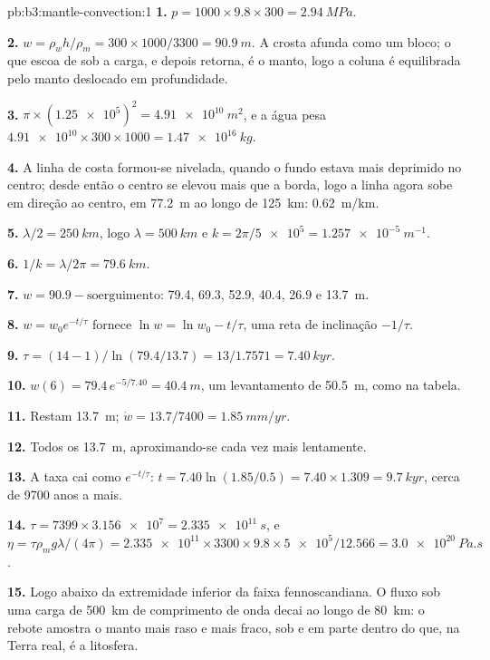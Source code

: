 \begin{solution}{pb:b3:mantle-convection:1}
\textbf{1.} $p = 1000\times9.8\times300 = \qty{2.94}{MPa}$.

\textbf{2.} $w = \rho_wh/\rho_m = 300\times1000/3300 = \qty{90.9}{m}$. A crosta
afunda como um bloco; o que escoa de sob a carga, e depois retorna, é o
manto, logo a coluna é equilibrada pelo manto deslocado em profundidade.

\textbf{3.} $\pi\times(\num{1.25e5})^2 = \qty{4.91e10}{m^2}$, e a água
pesa $\num{4.91e10}\times300\times1000 = \qty{1.47e16}{kg}$.

\textbf{4.} A linha de costa formou-se nivelada, quando o fundo estava mais deprimido no
centro; desde então o centro se elevou mais que a borda, logo a linha agora
sobe em direção ao centro, em \qty{77.2}{m} ao longo de \qty{125}{km}:
\qty{0.62}{m/km}.

\textbf{5.} $\lambda/2 = \qty{250}{km}$, logo $\lambda = \qty{500}{km}$ e $k =
2\pi/\num{5e5} = \qty{1.257e-5}{m^{-1}}$.

\textbf{6.} $1/k = \lambda/2\pi = \qty{79.6}{km}$.

\textbf{7.} $w = 90.9 - \text{soerguimento}$: 79.4, 69.3, 52.9, 40.4, 26.9 e
\qty{13.7}{m}.

\textbf{8.} $w = w_0e^{-t/\tau}$ fornece $\ln w = \ln w_0 - t/\tau$, uma reta
de inclinação $-1/\tau$.

\textbf{9.} $\tau = (14 - 1)/\ln(79.4/13.7) = 13/1.7571 = \qty{7.40}{kyr}$.

\textbf{10.} $w(6) = 79.4\,e^{-5/7.40} = \qty{40.4}{m}$, um levantamento de
\qty{50.5}{m}, como na tabela.

\textbf{11.} Restam \qty{13.7}{m}; $\dot w = 13.7/7400 = \qty{1.85}{mm/yr}$.

\textbf{12.} Todos os \qty{13.7}{m}, aproximando-se cada vez mais lentamente.

\textbf{13.} A taxa cai como $e^{-t/\tau}$: $t = 7.40\ln(1.85/0.5) =
7.40\times1.309 = \qty{9.7}{kyr}$, cerca de 9700 anos a mais.

\textbf{14.} $\tau = 7399\times\num{3.156e7} = \qty{2.335e11}{s}$, e $\eta =
\tau\rho_mg\lambda/(4\pi) = \num{2.335e11}\times3300\times9.8\times\num{5e5}/
12.566 = \qty{3.0e20}{Pa.s}$.

\textbf{15.} Logo abaixo da extremidade inferior da faixa fennoscandiana. O fluxo
sob uma carga de \qty{500}{km} de comprimento de onda decai ao longo de
\qty{80}{km}: o rebote amostra o manto mais raso e mais fraco, sob e em parte
dentro do que, na Terra real, é a litosfera.


\end{solution}
